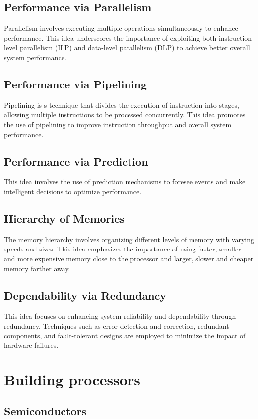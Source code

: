 \documentclass[12pt letter]{report}
\begin{document}
\section{Performance via Parallelism}
Parallelism involves executing multiple operations simultaneously to enhance performance. This idea underscores the
importance of exploiting both instruction-level parallelism (ILP) and data-level parallelism (DLP) to achieve  better
overall system performance.

\section{Performance via Pipelining}
Pipelining is s technique that divides the execution of instruction into stages, allowing multiple instructions to be
processed concurrently. This idea promotes the use of pipelining to improve instruction throughput and overall system
performance.

\section{Performance via Prediction}
This idea involves the use of prediction mechanisms to foresee events and make intelligent decisions to optimize
performance.

\section{Hierarchy of Memories}
The memory hierarchy involves organizing different levels of memory with varying  speeds and sizes. This idea
emphasizes the importance of using faster, smaller and more expensive memory close to the processor and larger, slower
and cheaper memory farther away.

\section{Dependability via Redundancy}
This idea focuses on enhancing system reliability and dependability through redundancy.  Techniques such as error
detection and correction, redundant components, and fault-tolerant designs are employed to minimize the impact of
hardware failures.


\chapter{Building processors}
\section{Semiconductors}
\end{document}
